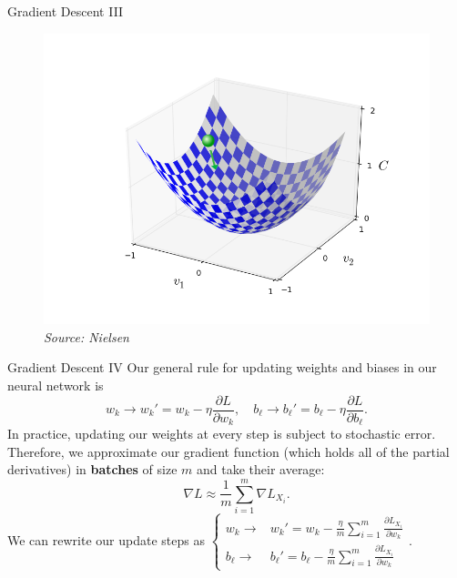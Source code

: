 \documentclass[xcolor=dvipsnames, fontsize=11pt, %
pagesize, %
parskip=half-, t]{beamer}
\begin{document}
 \begin{frame}[c]{Gradient Descent III}
 \begin{figure}[H] \center
 \includegraphics[scale=0.32]{valley_with_ball.png}
 \caption{\textit{Source: Nielsen}}
 \end{figure}
 \end{frame}
 \begin{frame}{Gradient Descent IV}
 Our general rule for updating weights and biases in our neural network is $$w_k\to w_k'=w_k-\eta \frac{\partial L}{\partial w_k}, \quad b_{\ell}\to b_{\ell}'=b_{\ell}-\eta \frac{\partial L}{\partial b_{\ell}}.$$
 In practice, updating our weights at every step is subject to stochastic error. \pause Therefore, we approximate our gradient function (which holds all of the partial derivatives) in \textbf{batches} of size $m$ and take their average: $$\nabla L\approx \frac{1}{m}\sum_{i=1}^{m}\nabla L_{X_i}.$$  \pause 
 We can rewrite our update steps as $\begin{cases} w_k\to & w_k'=w_k-\frac{\eta}{m} \sum_{i=1}^{m} \frac{\partial L_{X_i}}{\partial w_k} \\  b_{\ell}\to & b_{\ell}'=b_{\ell}-\frac{\eta}{m} \sum_{i=1}^{m} \frac{\partial L_{X_i}}{\partial w_k} \end{cases}.$
 
 \end{frame}
\end{document}
